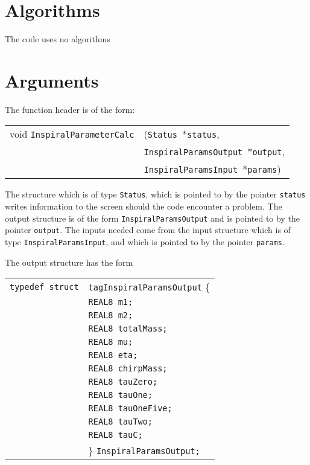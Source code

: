 \documentclass[12pt]{article}
\begin{document}
\section{Algorithms}

The code uses no algorithms


\section{Arguments}

The function header is of the form:

\vspace{5mm}

\begin{tabular}{ll}
void \texttt{InspiralParameterCalc}&(\texttt{Status $\ast$status},     \\
                                   &\texttt{InspiralParamsOutput $\ast$output}, \\
                                   &\texttt{InspiralParamsInput $\ast$params})
\end{tabular}

\vspace{5mm}

The structure which is of type \texttt{Status}, which is pointed to by the pointer \texttt{status} writes information to the screen should the code encounter
a problem. The output structure is of the form \texttt{InspiralParamsOutput} and is pointed to by the pointer \texttt{output}.
The inputs needed come from the input structure which is of type \texttt{InspiralParamsInput}, and which is pointed to by the pointer \texttt{params}.

The output structure has the form

\vspace{5mm}

\begin{tabular}{ll}
\texttt{typedef struct} & \texttt{tagInspiralParamsOutput} \{ \\
                        & \texttt{REAL8 m1;}  \\
                        & \texttt{REAL8 m2;}  \\
                        & \texttt{REAL8 totalMass;}  \\
                        & \texttt{REAL8 mu;}  \\
                        & \texttt{REAL8 eta;}  \\
                        & \texttt{REAL8 chirpMass;}  \\
                        & \texttt{REAL8 tauZero;}  \\
                        & \texttt{REAL8 tauOne;}  \\
                        & \texttt{REAL8 tauOneFive;}  \\
                        & \texttt{REAL8 tauTwo;}  \\
                        & \texttt{REAL8 tauC;}  \\
                        & \} \texttt{InspiralParamsOutput;}
\end{tabular}
\end{document}
